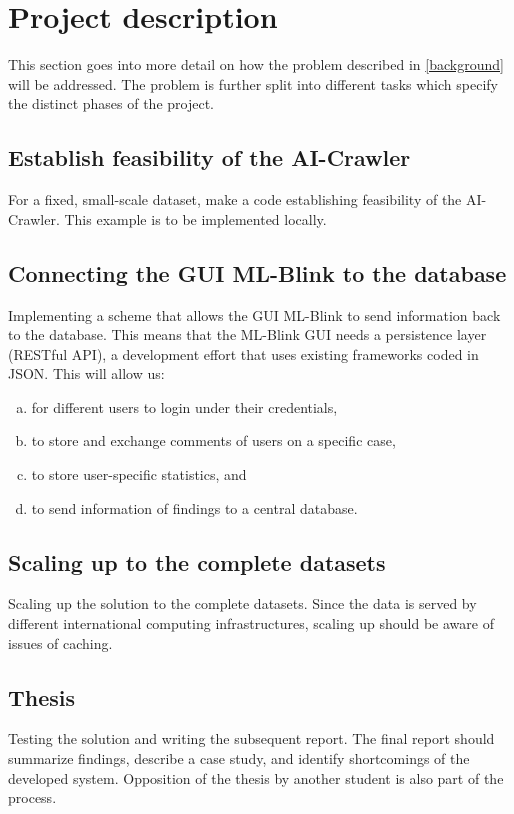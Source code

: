 \section{Project description} \label{description}

This section goes into more detail on how the problem described in \ref{background} will be addressed. The problem is further split into different tasks which specify the distinct phases of the project. 

\subsection{Establish feasibility of the AI-Crawler}

For a fixed, small-scale dataset, make a code establishing feasibility of the AI-Crawler. This example is to be implemented locally.

\subsection{Connecting the GUI ML-Blink to the database}

Implementing a scheme that allows the GUI ML-Blink to send information back to the database. This means that the ML-Blink GUI needs a persistence layer (RESTful API), a development effort that uses existing frameworks coded in JSON.  This will allow us:

\begin{enumerate}[(a)]
  \item for different users to login under their credentials,
  \item to store and exchange comments of users on a specific case,
  \item to store user-specific statistics, and
  \item to send information of findings to a central database.
\end{enumerate}

\subsection{Scaling up to the complete datasets}

Scaling up the solution to the complete datasets. Since the data is served by different international computing infrastructures, scaling up should be aware of issues of caching.
 
\subsection{Thesis}

Testing the solution and writing the subsequent report. The final report should summarize findings, describe a case study, and identify shortcomings of the developed system. Opposition of the thesis by another student is also part of the process.